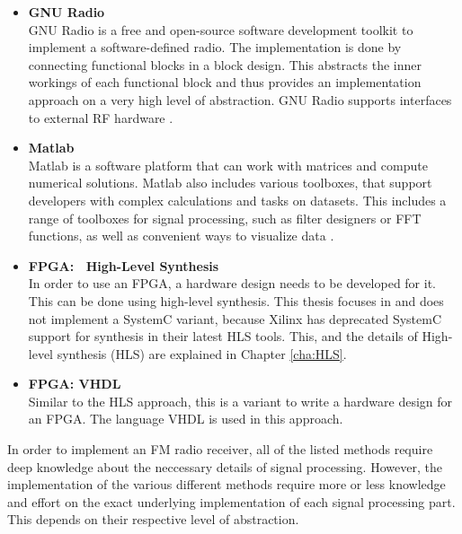 \begin{itemize}
  \item \textbf{GNU Radio}\\
      GNU Radio is a free and open-source software development toolkit to implement a software-defined radio.
      The implementation is done by connecting functional blocks in a block design.
      This abstracts the inner workings of each functional block and thus provides an implementation approach on a very high level of abstraction.
      GNU Radio supports interfaces to external RF hardware \cite{SoftwareGnuRadio}.
  \item \textbf{Matlab}\\
      Matlab is a software platform that can work with matrices and compute numerical solutions.
      Matlab also includes various toolboxes, that support developers with complex calculations and tasks on datasets.
      This includes a range of toolboxes for signal processing, such as filter designers or FFT functions, as well as convenient ways to visualize data \cite{SoftwareMatlab}.
  \item \textbf{FPGA: \cplusplus\ High-Level Synthesis}\\
      In order to use an FPGA, a hardware design needs to be developed for it.
      This can be done using high-level synthesis.
      This thesis focuses in \cplusplus and does not implement a SystemC variant, because Xilinx has deprecated SystemC support for synthesis in their latest HLS tools.
      This, and the details of High-level synthesis (HLS) are explained in Chapter \ref{cha:HLS}.

  \item \textbf{FPGA: VHDL}\\
      Similar to the HLS approach, this is a variant to write a hardware design for an FPGA.
      The language VHDL is used in this approach.
\end{itemize}

In order to implement an FM radio receiver, all of the listed methods require deep knowledge about the neccessary details of signal processing.
However, the implementation of the various different methods require more or less knowledge and effort on the exact underlying implementation of each signal processing part.
This depends on their respective level of abstraction.


